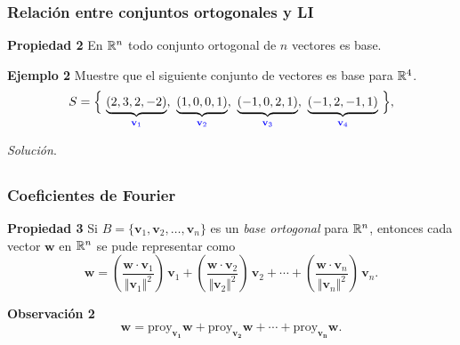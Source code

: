 \begin{frame}\frametitle{Relación entre conjuntos ortogonales y LI}


\begin{prop}{\textbf{Propiedad 2}}
	\justifying
	En $\mathbb{R}^n$ todo conjunto ortogonal de $n$ vectores es base.
\end{prop}	

\begin{ej}{\textbf{Ejemplo 2}}
	Muestre que el siguiente conjunto de vectores es base para $\mathbb{R}^4$.
	\[
		S = \Big\{ \, \underbrace{(2,3,2,-2)}_{\color{blue}\mathbf{v}_1}, \ \underbrace{(1,0,0,1)}_{\color{blue}\mathbf{v}_2}, \ 
	\underbrace{(-1,0,2,1)}_{\color{blue}\mathbf{v}_3}, \ \underbrace{(-1,2,-1,1)}_{\color{blue}\mathbf{v}_4} \, \Big\},
	\]
\end{ej}
\textit{Solución}.

\end{frame}


\subsection{}

\begin{frame}\frametitle{Coeficientes de Fourier}
	
	\begin{prop}{\textbf{Propiedad 3}}
		\justifying
		Si $B = \{ \mathbf{v}_1, \mathbf{v}_2, \hdots, \mathbf{v}_n\}$ es un \textit{base ortogonal} para $\mathbb{R}^n$, entonces
		cada vector $\mathbf{w}$ en $\mathbb{R}^n$ se pude representar como
		\[
		\mathbf{w} = \left( \frac{\mathbf{w}\cdot \mathbf{v}_1}{\Vert \mathbf{v}_1 \Vert^2} \right)\, \mathbf{v}_1 + 
		\left( \frac{\mathbf{w}\cdot \mathbf{v}_2}{\Vert \mathbf{v}_2 \Vert^2} \right)\, \mathbf{v}_2 + \cdots 
		+ \left( \frac{\mathbf{w}\cdot \mathbf{v}_n}{\Vert \mathbf{v}_n \Vert^2} \right)\, \mathbf{v}_n.
		\]
		
		\vspace{-1mm}
	\end{prop}		

	\begin{alertblock}{\textbf{Observación 2}}		
		\[
			\mathbf{w} = \text{proy}_{\mathbf{v_1}} \mathbf{w} + \text{proy}_{\mathbf{v_2}} \mathbf{w} + \cdots +
			 			 \text{proy}_{\mathbf{v_n}} \mathbf{w}. 
		\]
	\end{alertblock}
	
\end{frame}

